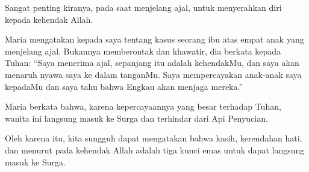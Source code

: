 Sangat penting kiranya, pada saat menjelang ajal, untuk menyerahkan diri kepada kehendak Allah.

Maria mengatakan kepada saya tentang kasus seorang ibu atas empat anak yang menjelang ajal. Bukannya memberontak dan khawatir, dia berkata kepada Tuhan: ``Saya menerima ajal, sepanjang itu adalah kehendakMu, dan saya akan menaruh nyawa saya ke dalam tanganMu. Saya mempercayakan anak-anak saya kepadaMu dan saya tahu bahwa Engkau akan menjaga mereka.''

Maria berkata bahwa, karena kepercayaannya yang besar terhadap Tuhan, wanita ini langsung masuk ke Surga dan terhindar dari Api Penyucian.

Oleh karena itu, kita sungguh dapat mengatakan bahwa kasih, kerendahan hati, dan menurut pada kehendak Allah adalah tiga kunci emas untuk dapat langsung masuk ke Surga.



\setlength{\parindent}{1cm}
